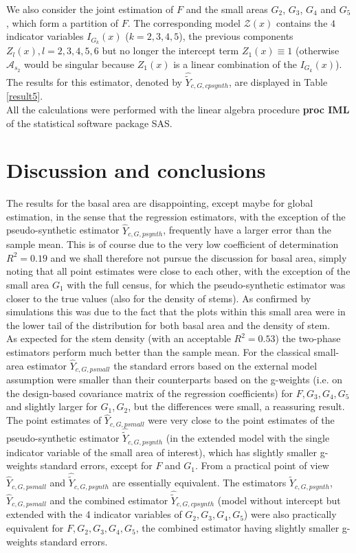 \documentclass[a4paper,12pt,leqno, titlepage]{article}
\begin{document}
 We also consider the joint estimation of $F$ and the small areas $G_2$, $G_3$, $G_4$ and $G_5$, which form a partition of $F$. The corresponding model $\pmb{\mathcal{Z}}(x)$ contains the $4$ indicator variables $I_{G_k}(x)$ ($k=2,3,4,5$), the previous components $Z_l(x), l=2,3,4,5,6$ but no longer the intercept term $Z_1(x) \equiv 1$ (otherwise $\pmb{\mathcal{A}}_{s_2}$ would be singular because $Z_1(x)$ is a linear combination of the $I_{G_k}(x)$). The results for this estimator, denoted by $ \hat{\tilde{Y}}_{c,G,cpsynth}$, are displayed in Table  \ref{result5}.\\
 All the calculations were performed with the linear algebra procedure \textbf{proc IML} of the statistical software package SAS.

\section{Discussion and conclusions}
 The results for the basal area are disappointing, except maybe for global estimation, in the sense that the regression estimators, with the exception of the pseudo-synthetic estimator $\hat{Y}_{c,G,psynth}$, frequently have a larger error than the sample mean. This is of course due to the very low coefficient of determination $R^2=0.19$ and we shall therefore not pursue the discussion for basal area, simply noting that all point estimates were close to each other, with the exception of the small area $G_1$ with the full census, for which the pseudo-synthetic estimator was closer to the true values (also for the density of stems). As confirmed by simulations this was due to the fact that the plots within this small area were in the lower tail of the distribution for both basal area and the density of stem. \\
As expected for the stem density (with an acceptable $R^2=0.53$) the two-phase estimators perform much better than the sample mean. For the classical small-area estimator $\hat{Y}_{c,G,psmall}$ the standard errors based on the external model assumption were smaller than their counterparts based on the g-weights (i.e. on the design-based covariance matrix of the regression coefficients) for $F,G_3,G_4,G_5$ and slightly larger for $G_1,G_2$, but the differences were small, a reassuring result. The point estimates of  $\hat{Y}_{c,G,psmall}$ were very close to the point estimates of the pseudo-synthetic estimator $\hat{\tilde{Y}}_{c,G,psynth}$ (in the extended model with the single indicator variable of the small area of interest), which has slightly smaller g-weights standard errors, except for $F$ and $G_1$. From a practical point of view $\hat{Y}_{c,G,psmall}$ and $\hat{\tilde{Y}}_{c,G,psynth}$ are essentially equivalent. The estimators $\hat{\tilde{Y}}_{c,G,psynth}$, $\hat{Y}_{c,G,psmall}$ and the combined estimator $\hat{\tilde{Y}}_{c,G,cpsynth}$ (model without intercept but extended with the 4 indicator variables of $G_2,G_3,G_4,G_5$) were also practically equivalent for $F,G_2,G_3,G_4,G_5$, the combined estimator having slightly smaller g-weights standard errors.\\
\end{document}
